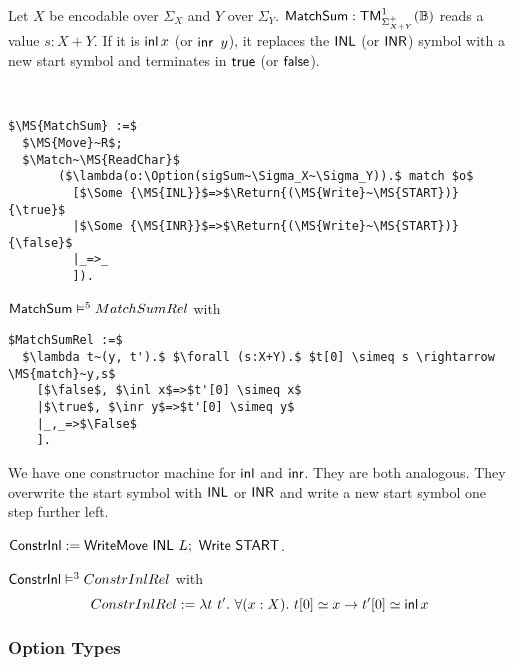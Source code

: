 Let $X$ be encodable over $\Sigma_X$ and $Y$ over $\Sigma_Y$.  $\mathsf{MatchSum} : \mathsf{TM}_{\Sigma_{X+Y}^+}^1(\mathbb{B})$ reads a value $s:X+Y$.  If it is
$\operatorname{\mathsf{inl}} x$ (or $\operatorname{\mathsf{inr}}~y$), it replaces the $\mathsf{INL}$ (or $\mathsf{INR}$) symbol with a new start symbol and terminates in $\mathsf{true}$ (or $\mathsf{false}$).

%
\begin{definition}[$\MS{MatchSum}$][MatchSum]
  \label{def:MatchSum}
  ~
  \small
\begin{lstlisting}[style=semicoqstyle]
$\MS{MatchSum} :=$
  $\MS{Move}~R$;
  $\Match~\MS{ReadChar}$
       ($\lambda(o:\Option(sigSum~\Sigma_X~\Sigma_Y)).$ match $o$
         [$\Some {\MS{INL}}$=>$\Return{(\MS{Write}~\MS{START})}{\true}$
         |$\Some {\MS{INR}}$=>$\Return{(\MS{Write}~\MS{START})}{\false}$
         |_=>_
         ]).
\end{lstlisting}
\end{definition}

\begin{lemma}
  \label{lem:MatchSum_Realise}
  $\mathsf{MatchSum} \mathrel{\vDash^{5}} MatchSumRel$ with
\begin{lstlisting}[style=semicoqstyle]
$MatchSumRel :=$
  $\lambda t~(y, t').$ $\forall (s:X+Y).$ $t[0] \simeq s \rightarrow \MS{match}~y,s$
    [$\false$, $\inl x$=>$t'[0] \simeq x$
    |$\true$, $\inr y$=>$t'[0] \simeq y$
    |_,_=>$\False$
    ].
\end{lstlisting}
\end{lemma}

We have one constructor machine for $\operatorname{\mathsf{inl}}$ and $\operatorname{\mathsf{inr}}$.  They are both analogous.  They overwrite the start symbol with $\mathsf{INL}$ or $\mathsf{INR}$ and
write a new start symbol one step further left.
\begin{definition}
  \label{def:Constr_inl}
  $\mathsf{ConstrInl} := \mathsf{WriteMove}~\mathsf{INL}~L ;~ \mathsf{Write}~\mathsf{START}$.
\end{definition}
\begin{lemma}
  \label{lem:Constr_inl_Sem}
  $\mathsf{ConstrInl} \mathrel{\vDash^{3}} ConstrInlRel$ with
  \[
    ConstrInlRel := \lambda t~t'.~\forall(x:X).~t[0] \simeq x \rightarrow t'[0] \simeq \operatorname{\mathsf{inl}} x
  \]
\end{lemma}

\subsubsection{Option Types}
\label{sec:match-option}

